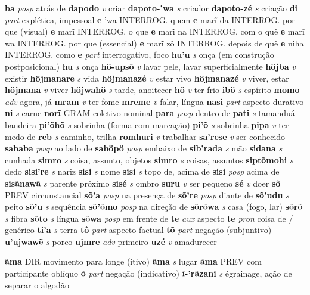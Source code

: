 \textbf{ba} \textit{posp} {atrás de}
\textbf{dapodo} \textit{v} {criar}
\textbf{dapoto-'wa} \textit{s} {criador}
\textbf{dapoto-zé} \textit{s} {criação}
\textbf{di} \textit{part} {explética, impessoal}
\textbf{e} {'wa} {INTERROG. quem}
\textbf{e} {marĩ} {da INTERROG. por que (visual)}
\textbf{e} {marĩ} {INTERROG. o que}
\textbf{e} {marĩ} {na INTERROG. com o quê}
\textbf{e} {marĩ} {wa INTERROG. por que (essencial)}
\textbf{e} {marĩ} {zô INTERROG. depois de quê}
\textbf{e} {niha} {INTERROG. como}
\textbf{e} \textit{part} {interrogativo, foco}
\textbf{hu'u} \textit{s} {onça (em construção postposicional)}
\textbf{hu} \textit{s} {onça}
\textbf{hö-upsõ} \textit{v} {lavar pele, lavar superficialmente}
\textbf{höjba} \textit{v} {existir}
\textbf{höjmanare} \textit{s} {vida}
\textbf{höjmanazé} \textit{v} {estar vivo}
\textbf{höjmanazé} \textit{v} {viver, estar}
\textbf{höjmana} \textit{v} {viver}
\textbf{höjwahö} \textit{s} {tarde, anoitecer}
\textbf{hö} \textit{v} {ter frio}
\textbf{ibö} \textit{s} {espírito}
\textbf{momo} \textit{adv} {agora, já}
\textbf{mram} \textit{v} {ter fome}
\textbf{mreme} \textit{v} {falar, língua}
\textbf{nasi} \textit{part} {aspecto durativo}
\textbf{ni} \textit{s} {carne}
\textbf{norĩ} {GRAM} {coletivo nominal}
\textbf{para} \textit{posp} {dentro de}
\textbf{pati} \textit{s} {tamanduá-bandeira}
\textbf{pi'õhõ} \textit{s} {sobrinha (forma com marcação)}
\textbf{pi'õ} \textit{s} {sobrinha}
\textbf{pipa} \textit{v} {ter medo de}
\textbf{reb} \textit{s} {caminho, trilha}
\textbf{romhuri} \textit{v} {trabalhar}
\textbf{sa'rese} \textit{v} {ser conhecido}
\textbf{sababa} \textit{posp} {ao lado de}
\textbf{sahöpö} \textit{posp} {embaixo de}
\textbf{sib'rada} \textit{s} {mão}
\textbf{sidana} \textit{s} {cunhada}
\textbf{simro} \textit{s} {coisa, assunto, objetos}
\textbf{simro} \textit{s} {coisas, assuntos}
\textbf{siptõmohi} \textit{s} {dedo}
\textbf{sisi're} \textit{s} {nariz}
\textbf{sisi} \textit{s} {nome}
\textbf{sisi} \textit{s} {topo de, acima de}
\textbf{sisi} \textit{posp} {acima de}
\textbf{sisãnawã} \textit{s} {parente próximo}
\textbf{sisé} \textit{s} {ombro}
\textbf{suru} \textit{v} {ser pequeno}
\textbf{sé} \textit{v} {doer}
\textbf{sô} {PREV} {circunstancial}
\textbf{sõ'a} \textit{posp} {na presença de}
\textbf{sõ're} \textit{posp} {diante de}
\textbf{sõ'udu} \textit{s} {peito}
\textbf{sõ'u} \textit{s} {sequência}
\textbf{sõ'õmo} \textit{posp} {na direção de}
\textbf{sõrõwa} \textit{s} {casa (fogo, lar)}
\textbf{sõrõ} \textit{s} {fibra}
\textbf{sõto} \textit{s} {língua}
\textbf{sõwa} \textit{posp} {em frente de}
\textbf{te} \textit{aux} {aspecto}
\textbf{te} \textit{pron} {coisa de / genérico}
\textbf{ti'a} \textit{s} {terra}
\textbf{tô} \textit{part} {aspecto factual}
\textbf{tõ} \textit{part} {negação (subjuntivo)}
\textbf{u'ujwawẽ} \textit{s} {porco}
\textbf{ujmre} \textit{adv} {primeiro}
\textbf{uzé} \textit{v} {amadurecer}


\textbf{ãma} {DIR} {movimento para longe (itivo)}
\textbf{ãma} \textit{s} {lugar}
\textbf{ãma} {PREV} {com participante oblíquo}
\textbf{õ} \textit{part} {negação (indicativo)}
\textbf{ĩ-'rãzani} \textit{s} {égrainage, ação de separar o algodão}
